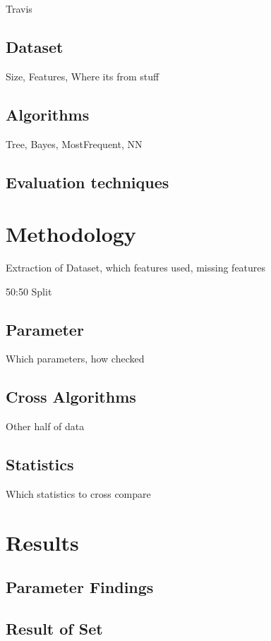 \documentclass[a4paper,11pt]{article}
\begin{document}
Travis

\subsection{Dataset}

Size, Features, Where its from stuff

\subsection{Algorithms}

Tree, Bayes, MostFrequent, NN

\subsection{Evaluation techniques}

\section{Methodology}

Extraction of Dataset, which features used, missing features

50:50 Split

\subsection{Parameter}

Which parameters, how checked


\subsection{Cross Algorithms}

Other half of data

\subsection{Statistics}

Which statistics to cross compare

\section{Results}

\subsection{Parameter Findings}

\subsection{Result of Set}
\end{document}

